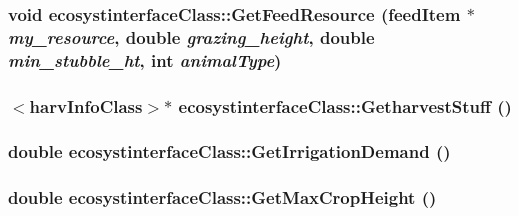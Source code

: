 \label{classecosystinterface_class_af71aa19f5610ccde073c4b498a449e62}
\hypertarget{classecosystinterface_class_a45ccc1ec44952040bb88f47974670b37}{
\subsubsection[{GetFeedResource}]{\setlength{\rightskip}{0pt plus 5cm}void ecosystinterfaceClass::GetFeedResource ({\bf feedItem} $\ast$ {\em my\_\-resource}, \/  double {\em grazing\_\-height}, \/  double {\em min\_\-stubble\_\-ht}, \/  int {\em animalType})}}
\label{classecosystinterface_class_a45ccc1ec44952040bb88f47974670b37}
\hypertarget{classecosystinterface_class_a3313299141cabab000f4865bc7ffa20f}{
\subsubsection[{GetharvestStuff}]{$<${\bf harvInfoClass}$>$$\ast$ ecosystinterfaceClass::GetharvestStuff ()}}
\label{classecosystinterface_class_a3313299141cabab000f4865bc7ffa20f}
\hypertarget{classecosystinterface_class_a131f3d53db5a70fffa21a2353f412ae6}{
\subsubsection[{GetIrrigationDemand}]{\setlength{\rightskip}{0pt plus 5cm}double ecosystinterfaceClass::GetIrrigationDemand ()}}
\label{classecosystinterface_class_a131f3d53db5a70fffa21a2353f412ae6}
\hypertarget{classecosystinterface_class_ae4efafe35834dd9514bc083c8173826b}{
\subsubsection[{GetMaxCropHeight}]{\setlength{\rightskip}{0pt plus 5cm}double ecosystinterfaceClass::GetMaxCropHeight ()}}
